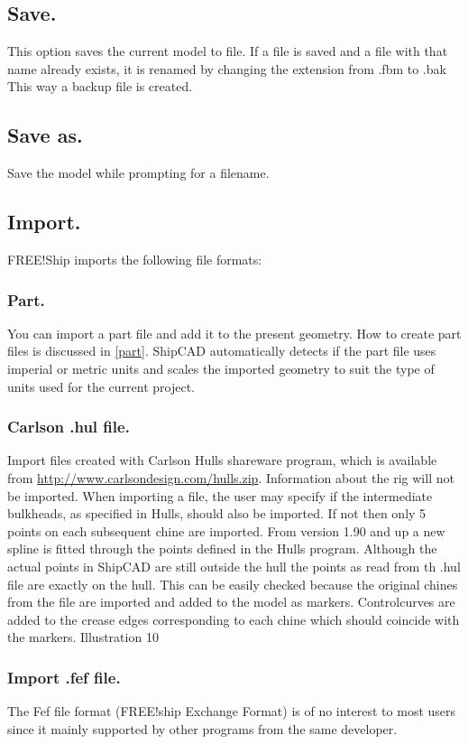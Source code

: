 \documentclass[12pt]{article}
\begin{document}
\subsection{Save.}
This option saves the current model to file. If a file is saved and a
file with that name already exists, it is renamed by changing the
extension from .fbm to .bak This way a backup file is created.

\subsection{Save as.}
Save the model while prompting for a filename.

\subsection{Import.}
FREE!Ship imports the following file formats:

\subsubsection{Part.}
You can import a part file and add it to the present geometry. How to
create part files is discussed in \ref{part}. ShipCAD automatically
detects if the part file uses imperial or metric units and scales the
imported geometry to suit the type of units used for the current
project.

\subsubsection{Carlson .hul file.}
Import files created with Carlson Hulls shareware program, which is
available from
\url{http://www.carlsondesign.com/hulls.zip}. Information about the rig will not be imported. When
importing a file, the user may specify if the intermediate bulkheads, as specified in Hulls, should
also be imported. If not then only 5 points on each subsequent chine are imported. From version
1.90 and up a new spline is fitted through the points defined in
the Hulls program. Although the actual points in ShipCAD are
still outside the hull the points as read from th .hul file are
exactly on the hull. This can be easily checked because the
original chines from the file are imported and added to the
model as markers. Controlcurves are added to the crease
edges corresponding to each chine which should coincide with
the markers.
Illustration 10

\subsubsection{Import .fef file.} \label{import-fef}
The Fef file format (FREE!ship Exchange Format) is of no interest to
most users since it mainly supported by other programs from the same
developer.
\end{document}
